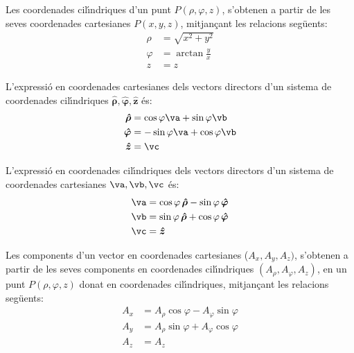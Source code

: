 \documentclass[catalan,a4paper,twoside,11pt]{article}
\begin{document}
Les coordenades  cil\'{\i}ndriques  d'un punt $P(\rho,\varphi,z)$,
s'obtenen a partir de les seves coordenades cartesianes $P(x,y,z)$,
mitjan\c{c}ant les relacions seg\"{u}ents:
\begin{subequations}\begin{align}
    \rho &= \sqrt{x^2+y^2}\\
    \varphi &=  \arctan\frac{y}{x}\\
    z &= z
\end{align}\end{subequations}

L'expressi\'{o} en coordenades cartesianes dels vectors directors d'un sistema de coordenades  cil\'{\i}ndriques $\boldsymbol{\hat{\rho}},\boldsymbol{\hat{\varphi}},\boldsymbol{\hat{z}}$ \'{e}s:
\begin{subequations}\begin{align}
    \boldsymbol{\hat{\rho}} &=\cos\varphi\va+\sin\varphi\vb \\
    \boldsymbol{\hat{\varphi}} &=-\sin\varphi\va+\cos\varphi\vb \\
    \boldsymbol{\hat{z}} &=\vc
\end{align}\end{subequations}

L'expressi\'{o} en coordenades cil\'{\i}ndriques dels vectors directors d'un sistema de coordenades  cartesianes $\va,\vb,\vc$ \'{e}s:
\begin{subequations}\begin{align}
    \va &=\cos\varphi\,\boldsymbol{\hat{\rho}}-\sin\varphi\,\boldsymbol{\hat{\varphi}} \\
    \vb &=\sin\varphi\,\boldsymbol{\hat{\rho}}+\cos\varphi\,\boldsymbol{\hat{\varphi}} \\
    \vc &=\boldsymbol{\hat{z}}
\end{align}\end{subequations}

Les components d'un vector en coordenades cartesianes ($A_x, A_y, A_z)$, s'obtenen a partir de les seves components en coordenades cil\'{\i}ndriques $(A_\rho, A_\varphi, A_z)$, en un punt $P(\rho,\varphi,z)$ donat en coordenades cil\'{\i}ndriques, mitjan\c{c}ant les relacions seg\"{u}ents:
\begin{subequations}\begin{align}
    A_x &=A_\rho \cos\varphi -A_\varphi\sin\varphi \\
    A_y &=A_\rho\sin\varphi +A_\varphi\cos\varphi\\
    A_z &= A_z
\end{align}\end{subequations}
\end{document}
